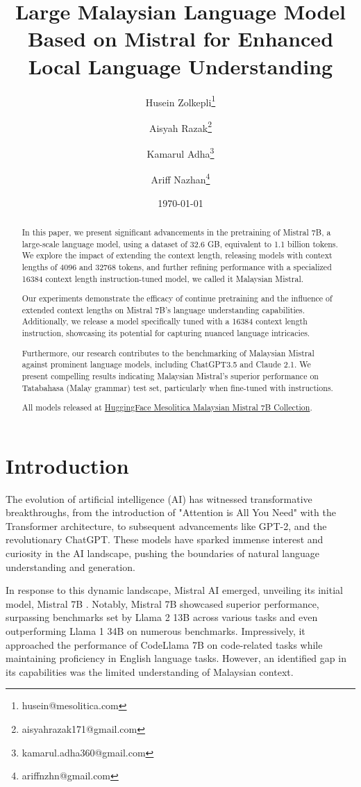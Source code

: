 \documentclass{article}
\title{Large Malaysian Language Model Based on Mistral for Enhanced Local Language Understanding}
\author{
  Husein Zolkepli\thanks{husein@mesolitica.com} \and 
  Aisyah Razak\thanks{aisyahrazak171@gmail.com} \and
  Kamarul Adha\thanks{kamarul.adha360@gmail.com} \and
  Ariff Nazhan\thanks{ariffnzhn@gmail.com}
}
\date{\today}
\begin{document}
\maketitle

\begin{abstract}
  In this paper, we present significant advancements in the pretraining of Mistral 7B, a large-scale language model, using a dataset of 32.6 GB, equivalent to 1.1 billion tokens. We explore the impact of extending the context length, releasing models with context lengths of 4096 and 32768 tokens, and further refining performance with a specialized 16384 context length instruction-tuned model, we called it Malaysian Mistral.

  Our experiments demonstrate the efficacy of continue pretraining and the influence of extended context lengths on Mistral 7B's language understanding capabilities. Additionally, we release a model specifically tuned with a 16384 context length instruction, showcasing its potential for capturing nuanced language intricacies.

  Furthermore, our research contributes to the benchmarking of Malaysian Mistral against prominent language models, including ChatGPT3.5 and Claude 2.1. We present compelling results indicating Malaysian Mistral's superior performance on Tatabahasa (Malay grammar) test set, particularly when fine-tuned with instructions.

  All models released at \href{https://huggingface.co/collections/mesolitica/malaysian-mistral-7b-6528f2ec825f4bba46c1700c}{HuggingFace Mesolitica Malaysian Mistral 7B Collection}.
\end{abstract}

\section{Introduction}
The evolution of artificial intelligence (AI) has witnessed transformative breakthroughs, from the introduction of "Attention is All You Need" \cite{vaswani2023attention} with the Transformer architecture, to subsequent advancements like GPT-2, and the revolutionary ChatGPT. These models have sparked immense interest and curiosity in the AI landscape, pushing the boundaries of natural language understanding and generation.

In response to this dynamic landscape, Mistral AI emerged, unveiling its initial model, Mistral 7B \cite{jiang2023mistral}. Notably, Mistral 7B showcased superior performance, surpassing benchmarks set by Llama 2 13B across various tasks and even outperforming Llama 1 34B on numerous benchmarks. Impressively, it approached the performance of CodeLlama 7B on code-related tasks while maintaining proficiency in English language tasks. However, an identified gap in its capabilities was the limited understanding of Malaysian context.
\end{document}
